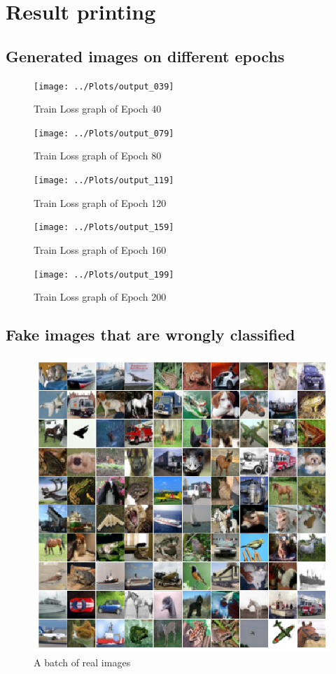 \documentclass[15pt]{article}
\begin{document}
\section{Result printing}
\subsection{Generated images on different epochs}

\begin{figure}[H]
\centering
\texttt{[image: ../Plots/output\_039]}
\caption{Train Loss graph of Epoch 40}
\end{figure}
\begin{figure}[H]
\centering
\texttt{[image: ../Plots/output\_079]}
\caption{Train Loss graph of Epoch 80}
\end{figure}
\begin{figure}[H]
\centering
\texttt{[image: ../Plots/output\_119]}
\caption{Train Loss graph of Epoch 120}
\end{figure}
\begin{figure}[H]
\centering
\texttt{[image: ../Plots/output\_159]}
\caption{Train Loss graph of Epoch 160}
\end{figure}
\begin{figure}[H]
\centering
\texttt{[image: ../Plots/output\_199]}
\caption{Train Loss graph of Epoch 200}
\end{figure}

\subsection{Fake images that are wrongly classified}
\begin{figure}[H]
\centering
\includegraphics[width=\textwidth]{../Visualization/real_images}
\caption{A batch of real images}
\end{figure}
\end{document}
